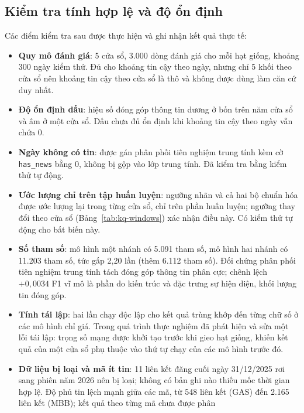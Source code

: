 \subsection{Kiểm tra tính hợp lệ và độ ổn định}

Các điểm kiểm tra sau được thực hiện và ghi nhận kết quả thực tế:

\begin{itemize}[nosep]
  \item \textbf{Quy mô đánh giá}: 5 cửa sổ, 3.000 dòng đánh giá cho mỗi hạt giống, khoảng
        300 ngày kiểm thử. Đủ cho khoảng tin cậy theo ngày, nhưng chỉ 5 khối theo cửa sổ nên
        khoảng tin cậy theo cửa sổ là thô và không được dùng làm căn cứ duy nhất.
  \item \textbf{Độ ổn định dấu}: hiệu số đóng góp thông tin dương ở bốn trên năm cửa sổ và
        âm ở một cửa sổ. Dấu chưa đủ ổn định khi khoảng tin cậy theo ngày vẫn chứa 0.
  \item \textbf{Ngày không có tin}: được gán phân phối tiên nghiệm trung tính kèm cờ \texttt{has\_news} bằng
        0, không bị gộp vào lớp trung tính. Đã kiểm tra bằng kiểm thử tự động.
  \item \textbf{Ước lượng chỉ trên tập huấn luyện}: ngưỡng nhãn và cả hai bộ chuẩn hóa được
        ước lượng lại trong từng cửa sổ, chỉ trên phần huấn luyện; ngưỡng thay đổi theo cửa
        sổ (Bảng~\ref{tab:kq-windows}) xác nhận điều này. Có kiểm thử tự động cho bất biến
        này.
  \item \textbf{Số tham số}: mô hình một nhánh có 5.091 tham số, mô hình hai nhánh có
        11.203 tham số, tức gấp 2,20 lần (thêm 6.112 tham số). Đối chứng phân phối tiên
        nghiệm trung tính tách đóng góp thông tin phân cực; chênh lệch $+0{,}0034$ F1 vĩ
        mô là phần do kiến trúc và đặc trưng sự hiện diện, khối lượng tin đóng góp.
  \item \textbf{Tính tái lập}: hai lần chạy độc lập cho kết quả trùng khớp đến từng chữ số ở
        các mô hình chỉ giá. Trong quá trình thực nghiệm đã phát hiện và sửa một lỗi tái lập:
        trọng số mạng được khởi tạo trước khi gieo hạt giống, khiến kết quả của một cửa sổ phụ
        thuộc vào thứ tự chạy của các mô hình trước đó.
  \item \textbf{Dữ liệu bị loại và mã ít tin}: 11 liên kết đăng cuối ngày 31/12/2025 rơi
        sang phiên năm 2026 nên bị loại; không có bản ghi nào thiếu mốc thời gian hợp lệ.
        Độ phủ tin lệch mạnh giữa các mã,
        từ 548 liên kết (GAS) đến 2.165 liên kết (MBB); kết quả theo từng mã chưa được phân

\end{itemize}
